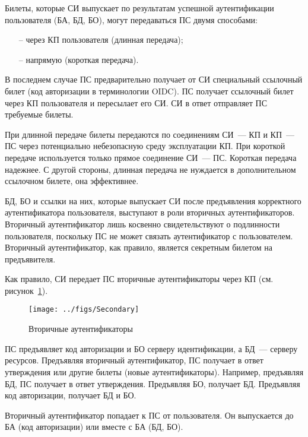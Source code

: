 Билеты, которые СИ выпускает по результатам успешной аутентификации 
пользователя (БА, БД, БО), могут передаваться ПС двумя способами:
\begin{itemize}
\item[--]
через КП пользователя (длинная передача);
\item[--]
напрямую (короткая передача).
\end{itemize}
%
В последнем случае ПС предварительно получает от СИ специальный ссылочный билет
(код авторизации в терминологии OIDC).
%
ПС получает ссылочный билет через КП пользователя и пересылает его СИ.
СИ в ответ отправляет ПС требуемые билеты.

При длинной передаче билеты передаются по соединениям
СИ~--- КП и КП~--- ПС через потенциально небезопасную 
среду эксплуатации КП. При короткой передаче используется
только прямое соединение СИ~--- ПС. Короткая передача надежнее.
С другой стороны, длинная передача не нуждается в дополнительном ссылочном 
билете, она эффективнее.

БД, БО и ссылки на них, которые выпускает СИ после предъявления корректного 
аутентификатора пользователя, выступают в роли вторичных аутентификаторов.
%
Вторичный аутентификатор лишь косвенно свидетельствуют о подлинности 
пользователя, поскольку ПС не может связать аутентификатор с пользователем. 
%
Вторичный аутентификатор, как правило, является секретным билетом на 
предъявителя.

Как правило, СИ передает ПС вторичные аутентификаторы через КП (см. 
рисунок~\ref{Fig.TM.Secondary}).

\begin{figure}[bht]
\begin{center}
\texttt{[image: ../figs/Secondary]}
\end{center}
\caption{Вторичные аутентификаторы}
\label{Fig.TM.Secondary}
\end{figure}

ПС предъявляет код авторизации и БО серверу идентификации,
а БД~--- серверу ресурсов.
%
Предъявляя вторичный аутентификатор, ПС получает в ответ 
утверждения или другие билеты (новые аутентификаторы).
%
Например, предъявляя БД, ПС получает в ответ утверждения.
Предъявляя БО, получает БД.
Предъявляя код авторизации, получает БД и БО.

Вторичный аутентификатор попадает к ПС от пользователя. 
Он выпускается до БА (код авторизации) или вместе с 
БА (БД, БО).  

